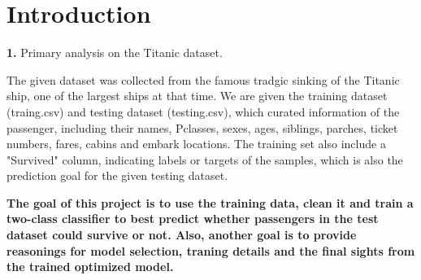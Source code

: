 \setlength\intextsep{1mm}

\section*{\textbf{Introduction}}

\textbf{1.} Primary analysis on the Titanic dataset.

The given dataset was collected from the famous tradgic sinking of the Titanic ship, one of the largest ships at that time. We are given the training dataset (traing.csv) and testing dataset (testing.csv), which curated information of the passenger, including their names, Pclasses, sexes, ages, siblings, parches, ticket numbers, fares, cabins and embark locations. The training set also include a "Survived" column, indicating labels or targets of the samples, which is also the prediction goal for the given testing dataset.

\textbf{The goal of this project is to use the training data, clean it and train a two-class classifier to best predict whether passengers in the test dataset could survive or not. Also, another goal is to provide reasonings for model selection, traning details and the final sights from the trained optimized model.}

